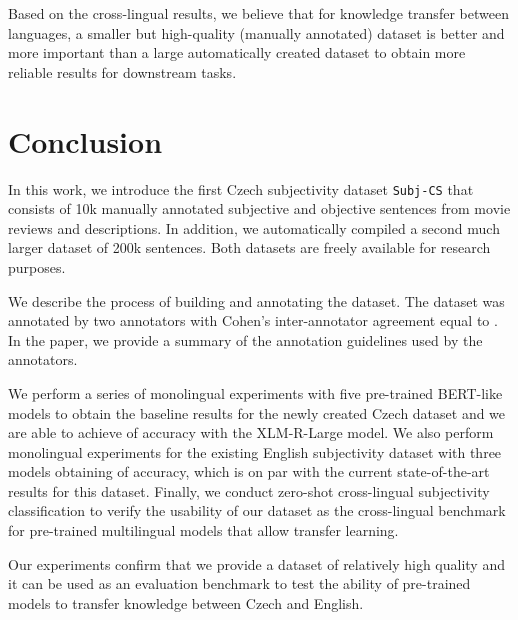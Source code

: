 \documentclass[10pt, a4paper]{article}
\begin{document}
\par Based on the cross-lingual results, we believe that for knowledge transfer between languages, a smaller but high-quality (manually annotated) dataset is better and more important than a large automatically created dataset to obtain more reliable results for downstream tasks. 





















\section{Conclusion}
In this work, we introduce the first Czech subjectivity dataset \texttt{Subj-CS} that consists of 10k manually annotated subjective and objective sentences from movie reviews and descriptions.
In addition, we automatically compiled a second much larger dataset of 200k sentences. Both datasets are freely available for research purposes.

\par We describe the process of building and annotating the dataset. The dataset was annotated by two annotators with Cohen’s  inter-annotator agreement equal to . In the paper, we provide a summary of the annotation guidelines used by the annotators.

\par We perform a series of monolingual experiments with five pre-trained BERT-like models to obtain the baseline results for the newly created Czech dataset and we are able to achieve  of accuracy with the XLM-R-Large model. We also perform monolingual experiments for the existing English subjectivity dataset with three models obtaining  of accuracy, which is on par with the current state-of-the-art results for this dataset. Finally, we conduct zero-shot cross-lingual subjectivity classification to verify the usability of our dataset as the cross-lingual benchmark for pre-trained multilingual models that allow transfer learning. 

\par Our experiments confirm that we provide a dataset of relatively high quality and it can be used as an evaluation benchmark to test the ability of pre-trained models to transfer knowledge between Czech and English.
\end{document}

